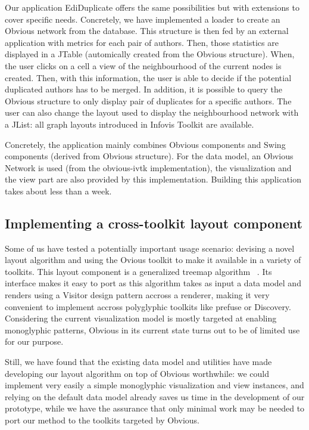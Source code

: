 Our application EdiDuplicate offers the same possibilities but with extensions to cover specific needs. Concretely, we have implemented a loader to create an Obvious network from the  database. This structure is then fed by an external application with metrics for each pair of authors. Then, those statistics are displayed in a JTable (automically created from the Obvious structure). When, the user clicks on a cell a view of the neighbourhood of the current nodes is created. Then, with this information, the user is able to decide if the potential duplicated authors has to be merged. In addition, it is possible to query the Obvious structure to only display pair of duplicates for a specific authors. The user can also change the layout used to display the neighbourhood network with a JList: all graph layouts introduced in Infovis Toolkit are available. 

Concretely, the application mainly combines Obvious components and Swing components (derived from Obvious structure). For the data model, an Obvious Network is used (from the obvious-ivtk implementation), the visualization and the view part are also provided by this implementation. Building this application takes about less than a week.

\subsection{Implementing a cross-toolkit layout component}

Some of us have tested a potentially important usage scenario: devising a novel layout algorithm and using the Ovious toolkit to make it available in a variety of toolkits. This layout component is a generalized treemap algorithm ~\cite{Treemaps2011}. Its interface makes it easy to port as this algorithm takes as input a data model and renders using a Visitor design pattern accross a renderer, making it very convenient to implement accross polyglyphic toolkits like prefuse or Discovery. Considering the current visualization model is mostly targeted at enabling monoglyphic patterns, Obvious in its current state turns out to be of limited use for our purpose.

Still, we have found that the existing data model and utilities have made developing our layout algorithm on top of Obvious worthwhile: we could implement very easily a simple monoglyphic visualization and view instances, and relying on the default data model already saves us time in the development of our prototype, while we have the assurance that only minimal work may be needed to port our method to the toolkits targeted by Obvious.








